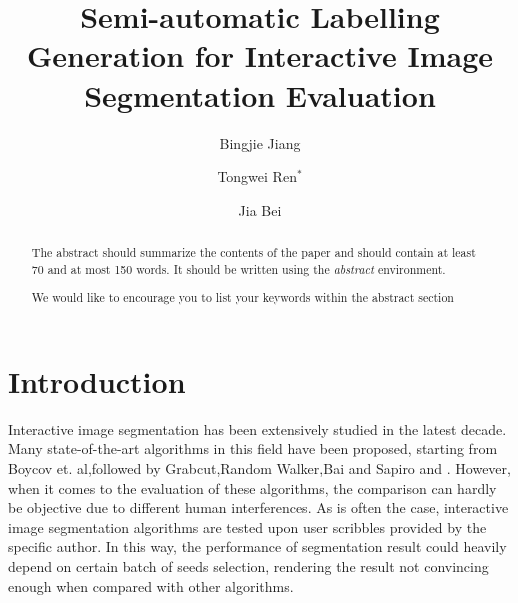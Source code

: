 \documentclass[runningheads,a4paper]{llncs}
\newcommand{\keywords}[1]{\par\addvspace\baselineskip
\noindent\keywordname\enspace\ignorespaces#1}
\begin{document}
\mainmatter  %

\title{Semi-automatic Labelling Generation for Interactive Image Segmentation Evaluation}


%
%
\author{Bingjie Jiang \and Tongwei Ren$^{*}$ \and Jia Bei}
%


\maketitle


\begin{abstract}
The abstract should summarize the contents of the paper and should
contain at least 70 and at most 150 words. It should be written using the
\emph{abstract} environment.
\keywords{We would like to encourage you to list your keywords within
the abstract section}
\end{abstract}


\section{Introduction}
Interactive image segmentation has been extensively studied in the latest decade. Many state-of-the-art algorithms in this field have been proposed, starting from Boycov et. al\citep{boykov2001interactive},followed by Grabcut\citep{rother2004grabcut},Random Walker\citep{grady2006random},Bai and Sapiro \citep{bai2007geodesic} and \citep{gulshan2010geodesic}. However, when it comes to the evaluation of these algorithms, the comparison can hardly be objective due to different human interferences. As is often the case, interactive image segmentation algorithms are tested upon user scribbles provided by the specific author. In this way, the performance of segmentation result could heavily depend on certain batch of seeds selection, rendering the result not convincing enough when compared with other algorithms.
\end{document}

